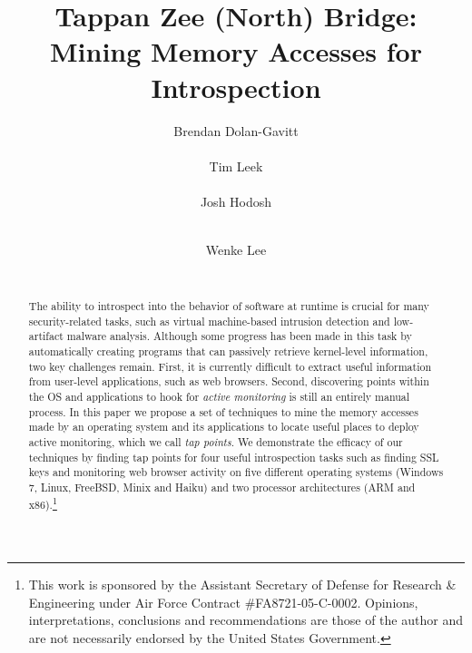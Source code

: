 \documentclass{sig-alternate-2013}
\begin{document}
\date{}

\title{Tappan Zee (North) Bridge: Mining Memory Accesses for Introspection}


\author{
\alignauthor
Brendan Dolan-Gavitt\\
    \\
\alignauthor
Tim Leek\\
    \\
\alignauthor
Josh Hodosh\\
    \\
\and
\alignauthor
Wenke Lee\\
    \\
} %

\maketitle

\thispagestyle{empty}

\begin{abstract}

The ability to introspect into the behavior of software at runtime is
crucial for many security-related tasks, such as virtual machine-based
intrusion detection and low-artifact malware analysis. Although some
progress has been made in this task by automatically creating programs
that can passively retrieve kernel-level information, two key challenges
remain. First, it is currently difficult to extract useful information
from user-level applications, such as web browsers. Second, discovering
points within the OS and applications to hook for \emph{active
monitoring} is still an entirely manual process. In this paper we
propose a set of techniques to mine the memory accesses made by an
operating system and its applications to locate useful places to deploy
active monitoring, which we call \emph{tap points}. We demonstrate the
efficacy of our techniques by finding tap points for four useful
introspection tasks such as finding SSL keys and monitoring web browser
activity on five different operating systems (Windows 7, Linux, FreeBSD,
Minix and Haiku) and two processor architectures (ARM and x86).\footnote{This
work is sponsored by the Assistant Secretary of Defense for Research \&
Engineering under Air Force Contract \#FA8721-05-C-0002. Opinions,
interpretations, conclusions and recommendations are those of the author and
are not necessarily endorsed by the United States Government.}

\end{abstract}
\end{document}
